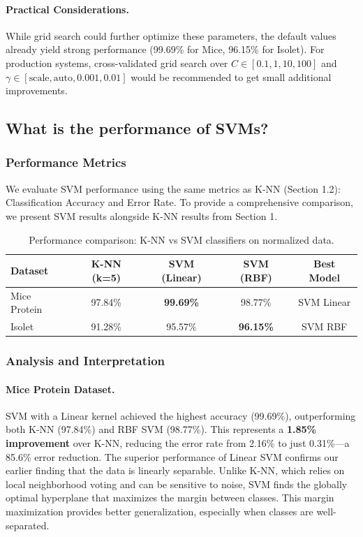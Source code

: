\documentclass[12pt]{article}
\begin{document}
\paragraph{Practical Considerations.} While grid search could further optimize these parameters, the default values already yield strong performance (99.69\% for Mice, 96.15\% for Isolet). For production systems, cross-validated grid search over $C \in [0.1, 1, 10, 100]$ and $\gamma \in [\text{scale}, \text{auto}, 0.001, 0.01]$ would be recommended to get small additional improvements.

\subsection{What is the performance of SVMs?}

\subsubsection{Performance Metrics}
We evaluate SVM performance using the same metrics as K-NN (Section 1.2): Classification Accuracy and Error Rate. To provide a comprehensive comparison, we present SVM results alongside K-NN results from Section 1.

\begin{table}[H]
\centering
\begin{tabular}{lcccc}
\toprule
\textbf{Dataset} & \textbf{K-NN (k=5)} & \textbf{SVM (Linear)} & \textbf{SVM (RBF)} & \textbf{Best Model} \\
\midrule
Mice Protein & 97.84\% & \textbf{99.69\%} & 98.77\% & SVM Linear \\
Isolet & 91.28\% & 95.57\% & \textbf{96.15\%} & SVM RBF \\
\bottomrule
\end{tabular}
\caption{Performance comparison: K-NN vs SVM classifiers on normalized data.}
\label{tab:svm_vs_knn}
\end{table}

\subsubsection{Analysis and Interpretation}

\paragraph{Mice Protein Dataset.} SVM with a Linear kernel achieved the highest accuracy (99.69\%), outperforming both K-NN (97.84\%) and RBF SVM (98.77\%). This represents a \textbf{1.85\% improvement} over K-NN, reducing the error rate from 2.16\% to just 0.31\%—a 85.6\% error reduction. The superior performance of Linear SVM confirms our earlier finding that the data is linearly separable. Unlike K-NN, which relies on local neighborhood voting and can be sensitive to noise, SVM finds the globally optimal hyperplane that maximizes the margin between classes. This margin maximization provides better generalization, especially when classes are well-separated.
\end{document}
